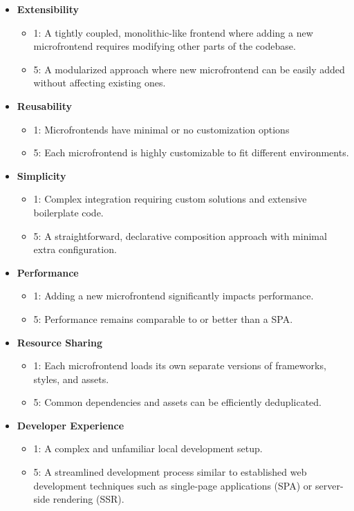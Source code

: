 \begin{itemize}
  \item \textbf{Extensibility} 
    \begin{itemize}
      \item 1: A tightly coupled, monolithic-like frontend where adding a new microfrontend requires modifying other parts of the codebase.
      \item 5: A modularized approach where new microfrontend can be easily added without affecting existing ones.
    \end{itemize}
  \item \textbf{Reusability} 
    \begin{itemize}
      \item 1: Microfrontends have minimal or no customization options
      \item 5: Each microfrontend is highly customizable to fit different environments.
    \end{itemize}
  \item \textbf{Simplicity} 
    \begin{itemize}
      \item 1: Complex integration requiring custom solutions and extensive boilerplate code.
      \item 5: A straightforward, declarative composition approach with minimal extra configuration.
    \end{itemize}
  \item \textbf{Performance} 
    \begin{itemize}
      \item 1: Adding a new microfrontend significantly impacts performance.
      \item 5: Performance remains comparable to or better than a SPA.
    \end{itemize}
  \item \textbf{Resource Sharing} 
    \begin{itemize}
      \item 1: Each microfrontend loads its own separate versions of frameworks, styles, and assets.
      \item 5: Common dependencies and assets can be efficiently deduplicated.
    \end{itemize}
  \item \textbf{Developer Experience} 
    \begin{itemize}
      \item 1: A complex and unfamiliar local development setup.
      \item 5: A streamlined development process similar to established web development techniques such as single-page applications (SPA) or server-side rendering (SSR).
    \end{itemize}
\end{itemize}

